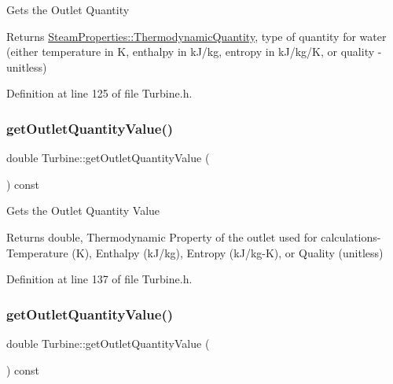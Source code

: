 Gets the Outlet Quantity

\begin{DoxyReturn}{Returns}
\hyperlink{class_steam_properties_ae0294bedf7d178c2d8fb6aed0f62fbff}{Steam\+Properties\+::\+Thermodynamic\+Quantity}, type of quantity for water (either temperature in K, enthalpy in k\+J/kg, entropy in k\+J/kg/K, or quality -\/ unitless) 
\end{DoxyReturn}


Definition at line 125 of file Turbine.\+h.

\mbox{\label{class_turbine_aca98f128213e02e95dfd6f4b2ad8de4e}} 
\subsubsection{\texorpdfstring{get\+Outlet\+Quantity\+Value()}{getOutletQuantityValue()}\hspace{0.1cm}{\footnotesize\ttfamily [1/3]}}
{\footnotesize\ttfamily double Turbine\+::get\+Outlet\+Quantity\+Value (\begin{DoxyParamCaption}{ }\end{DoxyParamCaption}) const\hspace{0.3cm}{\ttfamily [inline]}}

Gets the Outlet Quantity Value

\begin{DoxyReturn}{Returns}
double, Thermodynamic Property of the outlet used for calculations-\/ Temperature (K), Enthalpy (k\+J/kg), Entropy (k\+J/kg-\/K), or Quality (unitless) 
\end{DoxyReturn}


Definition at line 137 of file Turbine.\+h.

\mbox{\label{class_turbine_aca98f128213e02e95dfd6f4b2ad8de4e}} 
\subsubsection{\texorpdfstring{get\+Outlet\+Quantity\+Value()}{getOutletQuantityValue()}\hspace{0.1cm}{\footnotesize\ttfamily [2/3]}}
{\footnotesize\ttfamily double Turbine\+::get\+Outlet\+Quantity\+Value (\begin{DoxyParamCaption}{ }\end{DoxyParamCaption}) const\hspace{0.3cm}{\ttfamily [inline]}}

